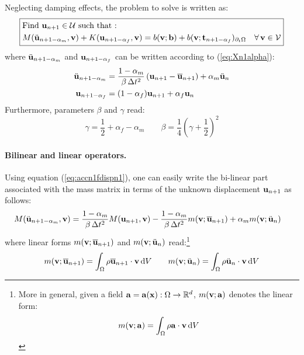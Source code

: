 Neglecting damping effects, the problem to solve is written as:
\begin{equation}
\boxed{\begin{aligned} & \text{Find \ensuremath{{\bf{u}}_{n+1}\in\mathcal{U}} such that : }\\
 & M(\ddot{{\bf{u}}}_{n+1-\alpha_{m}},{\bf{v}})+K({\bf{u}}_{n+1-\alpha_{f}},{\bf{v}})=b({\bf{v}};{\bf{b}})+b({\bf{v}};{\bf t}_{n+1-\alpha_{f}})_{\partial_{t}\Omega}\quad\text{\ensuremath{\forall\,}}{\bf{v}}\in\mathcal{V}
\end{aligned}
}
\end{equation}
where $\ddot{{\bf{u}}}_{n+1-\alpha_{m}}$ and ${\bf{u}}_{n+1-\alpha_{f}}$ can
be written according to (\ref{eq:Xn1alpha}):
\begin{equation}
\begin{aligned}\ddot{{\bf{u}}}_{n+1-\alpha_{m}} & =\frac{1-\alpha_{m}}{\beta\,\Delta t^{2}}\left({\bf{u}}_{n+1}-\overline{{\bf{u}}}_{n+1}\right)+\alpha_{m}\ddot{{\bf{u}}}_{n}\\
{\bf{u}}_{n+1-\alpha_{f}} & =(1-\alpha_{f}){\bf{u}}_{n+1}+\alpha_{f}{\bf{u}}_{n}
\end{aligned}
\label{eq:accn1fdispn1-1}
\end{equation}
Furthermore, parameters $\beta$ and $\gamma$ read:
\begin{equation}
    \gamma = \frac{1}{2}+ \alpha_f - \alpha_m \qquad \beta = \frac{1}{4} \left( \gamma + \frac{1}{2}\right)^2
\end{equation}

\paragraph{Bilinear and linear operators.}

Using equation (\ref{eq:accn1fdispn1}), one can easily write the
bi-linear part associated with the mass matrix in terms of the unknown
displacement ${\bf{u}}_{n+1}$ as follows:
\begin{equation}
\begin{aligned}M(\ddot{{\bf{u}}}_{n+1-\alpha_{m}},{\bf{v}}) & =\frac{1-\alpha_{m}}{\beta\,\Delta t^{2}}M({\bf{u}}_{n+1},{\bf{v}})-\frac{1-\alpha_{m}}{\beta\,\Delta t^{2}}m({\bf{v}};\overline{{\bf{u}}}_{n+1})+\alpha_{m}m({\bf{v}};\ddot{{\bf{u}}}_{n})\end{aligned}
\label{eq:M_1}
\end{equation}
where linear forms $m({\bf{v}};\overline{{\bf{u}}}_{n+1})$ and $m({\bf{v}};\ddot{{\bf{u}}}_{n})$
read:\footnote{More in general, given a field ${\bf{a}}={\bf{a}}({\bf{x}}):\Omega\to\mathbb{R}^{d}$,
$m({\bf{v}};{\bf{a}})$ denotes the linear form:
\begin{equation}
m({\bf{v}};{\bf{a}})=\int_{\Omega}\rho{\bf{a}}\cdot{\bf{v}}\,{\rm d}V
\end{equation}}
\begin{equation}
m({\bf{v}};\overline{{\bf{u}}}_{n+1})=\int_{\Omega}\rho\overline{{\bf{u}}}_{n+1}\cdot{\bf{v}}\,{\rm d}V\qquad m({\bf{v}};\ddot{{\bf{u}}}_{n})=\int_{\Omega}\rho\ddot{{\bf{u}}}_{n}\cdot{\bf{v}}\,{\rm d}V
\end{equation}


